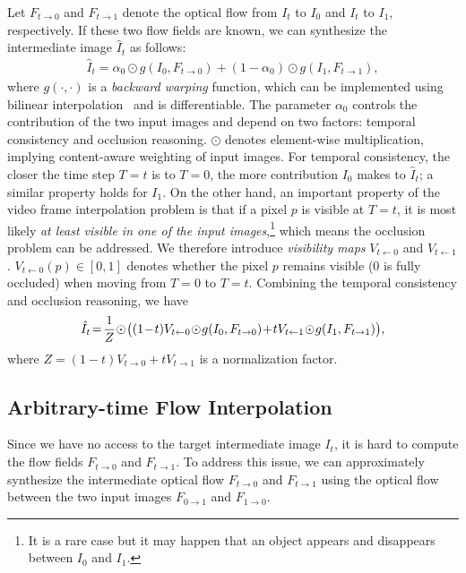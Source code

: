 \documentclass[10pt,twocolumn,letterpaper]{article}
\newcommand{\JK}[1]{{\color{magenta}JK: #1}}
\begin{document}
Let $F_{t\rightarrow0}$ and $F_{t\rightarrow1}$ denote the optical flow from $I_t$ to $I_0$ and $I_t$ to $I_1$, respectively. If these two flow fields are known, we can synthesize the intermediate image $\hat{I}_t$ as follows:
\begin{align}
\hat{I}_t = \alpha_0\odot g(I_0, F_{t\rightarrow0}) + (1 - \alpha_0)\odot g(I_1, F_{t\rightarrow1}),
\end{align}
where $g(\cdot, \cdot)$ is a \emph{backward warping} function, which can be implemented using bilinear interpolation~\cite{zhou16view,liu17video} and is differentiable. The parameter $\alpha_0$ controls the contribution of the two input images and depend on two factors: temporal consistency and occlusion reasoning. $\odot$ denotes element-wise multiplication, implying content-aware weighting of input images. For temporal consistency, the closer the time step $T=t$ is to $T=0$, the more contribution $I_0$ makes to $\hat{I}_t$; a similar property holds for $I_1$. On the other hand, an important property of the video frame interpolation problem is that if a pixel $p$ is visible at $T=t$, it is most likely \emph{at least visible in one of the input images},\footnote{It is a rare case but it may happen that an object appears and disappears between $I_0$ and $I_1$.} which means the occlusion problem can be addressed.
We therefore introduce \emph{visibility maps} $V_{t\leftarrow0}$ and $V_{t\leftarrow1}$. $V_{t\leftarrow0}(p)\in[0,1]$ denotes whether the pixel $p$ remains visible (0 is fully occluded) when moving from $T=0$ to $T=t$. Combining the temporal consistency and occlusion reasoning, we have
\begin{align}
\hat{I}_t \!=\! \frac{1}{Z}\!\odot\!\big((1\!-\!t)V_{t\leftarrow0}\!\odot \!g(I_0, F_{t\rightarrow0}) \!+\! tV_{t\leftarrow1}\!\odot \!g(I_1, F_{t\rightarrow1})\big)\notag,
\end{align}
where $Z=(1-t)V_{t\rightarrow 0}+tV_{t\rightarrow 1}$ is a normalization factor.

\subsection{Arbitrary-time Flow Interpolation}
\label{subsec:flow_interp}
Since we have no access to the target intermediate image $I_t$, it is hard to compute the flow fields $F_{t\rightarrow0}$ and $F_{t\rightarrow1}$. To address this issue, we can approximately synthesize the intermediate optical flow $F_{t\rightarrow0}$ and $F_{t\rightarrow1}$ using the optical flow between the two input images $F_{0\rightarrow1}$ and $F_{1\rightarrow0}$.
\end{document}
